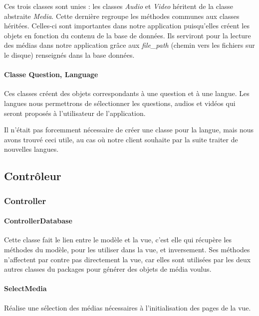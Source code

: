 Ces trois classes sont unies : les classes \textit{Audio} et \textit{Video} héritent de la classe abstraite \textit{Media}. Cette dernière regroupe les méthodes communes aux classes héritées. Celles-ci sont importantes dans notre application puisqu'elles créent les objets en fonction du contenu de la base de données. Ils serviront pour la lecture des médias dans notre application grâce aux \textit{file\_path} (chemin vers les fichiers sur le disque) renseignés dans la base données.

\paragraph{Classe Question, Language}

Ces classes créent des objets correspondants à une question et à une langue. Les langues nous permettrons de sélectionner les questions, audios et vidéos qui seront proposés à l'utilisateur de l'application.

Il n'était pas forcemment nécessaire de créer une classe pour la langue, mais nous avons trouvé ceci utile, au cas où notre client souhaite par la suite traiter de nouvelles langues.


\subsection{Contrôleur}\label{archi_controller}


\subsubsection{Controller}

\paragraph{ControllerDatabase}

Cette classe fait le lien entre le modèle et la vue, c'est elle qui récupère les méthodes du modèle, pour les utiliser dans la vue, et inversement. Ses méthodes n'affectent par contre pas directement la vue, car elles sont utilisées par les deux autres classes du packages pour générer des objets de média voulus.

\paragraph{SelectMedia}

Réalise une sélection des médias nécessaires à l'initialisation des pages de la vue.

